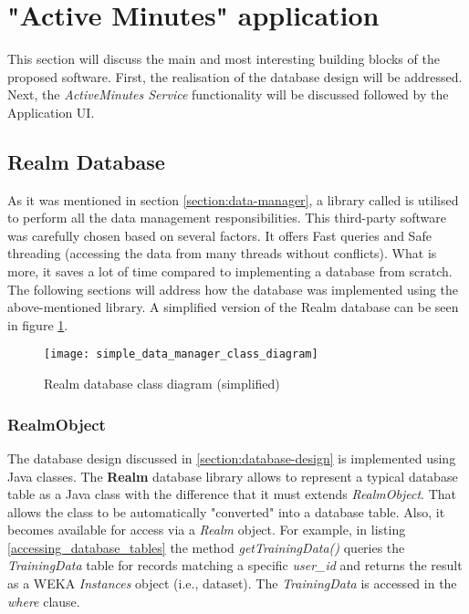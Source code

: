 \section{"Active Minutes" application} 
This section will discuss the main and most interesting building blocks of the proposed software. First, the realisation of the database design will be addressed. Next, the \textit{ActiveMinutes Service} functionality will be discussed followed by the Application UI.  
    
    \subsection{Realm Database}
    As it was mentioned in section \ref{section:data-manager}, a library called \citet{realmdatabase_2017} is utilised to perform all the data management responsibilities. This third-party software was carefully chosen based on several factors. It offers Fast queries and Safe threading (accessing the data from many threads without conflicts). What is more, it saves a lot of time compared to implementing a database from scratch. The following sections will address how the database was implemented using the above-mentioned library. A simplified version of the Realm database can be seen in figure \ref{fig:realm_database}. 
    
    \begin{figure}[ht]
    \centering
    \texttt{[image: simple\_data\_manager\_class\_diagram]}
    \caption{Realm database class diagram (simplified)}
    \label{fig:realm_database}
    \end{figure}
    
    \subsubsection{RealmObject}
     The database design discussed in \ref{section:database-design} is implemented using Java classes. The \textbf{Realm} database library allows to represent a typical database table as a Java class with the difference that it must extends \textit{RealmObject}. That allows the class to be automatically "converted" into a database table. Also, it becomes available for access via a \textit{Realm} object. For example, in listing \ref{accessing_database_tables} the method \textit{getTrainingData()} queries the \textit{TrainingData} table for records matching a specific \textit{user\_id} and returns the result as a WEKA \textit{Instances} object (i.e., dataset). The \textit{TrainingData} is accessed in the \textit{where} clause.
     
